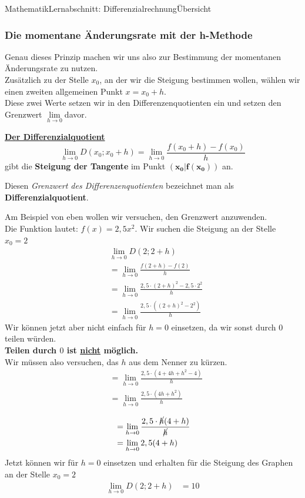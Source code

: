 \documentclass[11pt,twocolumn,oneside,openany,headings=optiontotoc,11pt,numbers=noenddot,final]{article}
\begin{document}
\begin{worksheet}{Mathematik}{Lernabschnitt: Differenzialrechnung}{Übersicht}
		\subsubsection{Die momentane Änderungsrate mit der h-Methode}
		Genau dieses Prinzip machen wir uns also zur Bestimmung der momentanen Änderungsrate zu nutzen.\\
		Zusätzlich zu der Stelle \(x_0\), an der wir die Steigung bestimmen wollen, wählen wir einen zweiten allgemeinen Punkt \(x = x_0 + h\).\\
		Diese zwei Werte setzen wir in den Differenzenquotienten ein und setzen den Grenzwert \(\lim\limits_{h\rightarrow{}0}\)davor.
		\begin{framed}
			\noindent
			\textbf{\underline{Der Differenzialquotient}}
			\[\lim\limits_{h\rightarrow{}0} D(x_0;x_0+h) = \lim\limits_{h\rightarrow{}0} \frac{f(x_0+h) - f(x_0)}{h}\]
			gibt die \textbf{Steigung der Tangente} im Punkt \(\mathbf{(x_0|f(x_0))}\) an.\\
			\par\noindent
			Diesen \textit{Grenzwert des Differenzenquotienten} bezeichnet man als \textbf{Differenzialquotient}.
		\end{framed}
		\noindent
		Am Beispiel von eben wollen wir versuchen, den Grenzwert anzuwenden.\\
		Die Funktion lautet: \(f(x) = 2,5x^2\). Wir suchen die Steigung an der Stelle \(x_0=2\)
		\begin{align*}
			& \lim\limits_{h\rightarrow{}0} D(2;2+h)\\
			& = \lim\limits_{h\rightarrow{}0} \frac{f(2+h)-f(2)}{h}\\
			& = \lim\limits_{h\rightarrow{}0} \frac{2,5\cdot(2+h)^2 - 2,5\cdot{}2^2}{h}\\
			& = \lim\limits_{h\rightarrow{}0} \frac{2,5\cdot((2+h)^2 - 2^2)}{h}
		\end{align*}
		Wir können jetzt aber nicht einfach für \(h = 0\) einsetzen, da wir sonst durch \(0\) teilen würden.\\
		\textbf{Teilen durch \(0\) ist \underline{nicht} möglich.}\\
		Wir müssen also versuchen, das \(h\) aus dem Nenner zu kürzen.
		\begin{align*}
			& = \lim\limits_{h\rightarrow{}0} \frac{2,5\cdot(4 + 4h + h^2 - 4)}{h}\\
			& = \lim\limits_{h\rightarrow{}0} \frac{2,5\cdot(4h + h^2)}{h}\\
		\end{align*}
		\begin{align*}
			& = \lim\limits_{h\rightarrow{}0} \frac{2,5\cdot\cancel{h}(4 + h)}{\cancel{h}}\\
			& = \lim\limits_{h\rightarrow{}0} 2,5(4 + h)\\
		\end{align*}
		Jetzt können wir für \(h = 0\) einsetzen und erhalten für die Steigung des Graphen an der Stelle \(x_0=2\)
		\begin{align*}
			\lim\limits_{h\rightarrow{}0} D(2;2+h) & = 10
		\end{align*}
	\end{worksheet}
\end{document}
